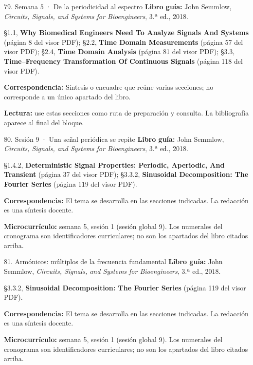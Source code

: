 \documentclass[
  10pt,
  ignorenonframetext,
  aspectratio=169,
  spanish,
]{beamer}
\begin{document}
\begin{frame}{79. Semana 5 · De la periodicidad al espectro}
\label{semana-5-de-la-periodicidad-al-espectro}
\textbf{Libro guía:} John Semmlow, \emph{Circuits, Signals, and Systems
for Bioengineers}, 3.ª ed., 2018.

§1.1, \textbf{Why Biomedical Engineers Need To Analyze Signals And
Systems} (página 8 del visor PDF); §2.2, \textbf{Time Domain
Measurements} (página 57 del visor PDF); §2.4, \textbf{Time Domain
Analysis} (página 81 del visor PDF); §3.3, \textbf{Time--Frequency
Transformation Of Continuous Signals} (página 118 del visor PDF).

\textbf{Correspondencia:} Síntesis o encuadre que reúne varias
secciones; no corresponde a un único apartado del libro.

\textbf{Lectura:} use estas secciones como ruta de preparación y
consulta. La bibliografía aparece al final del bloque.
\end{frame}

\begin{frame}{80. Sesión 9 · Una señal periódica se repite}
\label{sesiuxf3n-9-una-seuxf1al-periuxf3dica-se-repite}
\textbf{Libro guía:} John Semmlow, \emph{Circuits, Signals, and Systems
for Bioengineers}, 3.ª ed., 2018.

§1.4.2, \textbf{Deterministic Signal Properties: Periodic, Aperiodic,
And Transient} (página 37 del visor PDF); §3.3.2, \textbf{Sinusoidal
Decomposition: The Fourier Series} (página 119 del visor PDF).

\textbf{Correspondencia:} El tema se desarrolla en las secciones
indicadas. La redacción es una síntesis docente.

\textbf{Microcurrículo:} semana 5, sesión 1 (sesión global 9). Los
numerales del cronograma son identificadores curriculares; no son los
apartados del libro citados arriba.
\end{frame}

\begin{frame}{81. Armónicos: múltiplos de la frecuencia fundamental}
\label{armuxf3nicos-muxfaltiplos-de-la-frecuencia-fundamental}
\textbf{Libro guía:} John Semmlow, \emph{Circuits, Signals, and Systems
for Bioengineers}, 3.ª ed., 2018.

§3.3.2, \textbf{Sinusoidal Decomposition: The Fourier Series} (página
119 del visor PDF).

\textbf{Correspondencia:} El tema se desarrolla en las secciones
indicadas. La redacción es una síntesis docente.

\textbf{Microcurrículo:} semana 5, sesión 1 (sesión global 9). Los
numerales del cronograma son identificadores curriculares; no son los
apartados del libro citados arriba.
\end{frame}
\end{document}
